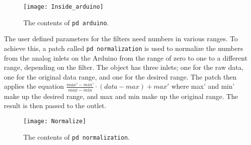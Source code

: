 \begin{figure}
\centering
\texttt{[image: Inside\_arduino]}
\caption{The contents of \texttt{pd arduino}.}
\label{Fig:Inside_arduino}
\end{figure}

The user defined parameters for the filters need numbers in various ranges. To achieve this, a patch called \texttt{pd normalization} is used to normalize the numbers from the analog inlets on the Arduino from the range of zero to one to a different range, depending on the filter. The object has three inlets; one for the raw data, one for the original data range, and one for the desired range. The patch then applies the equation $\frac{max'-min'}{max-min}\cdot (data-max)+max'$ where max' and min' make up the desired range, and max and min make up the original range. The result is then passed to the outlet.

\begin{figure}
\centering
\texttt{[image: Normalize]}
\caption{The contents of \texttt{pd normalization}.}
\label{Fig:Normalize}
\end{figure}
